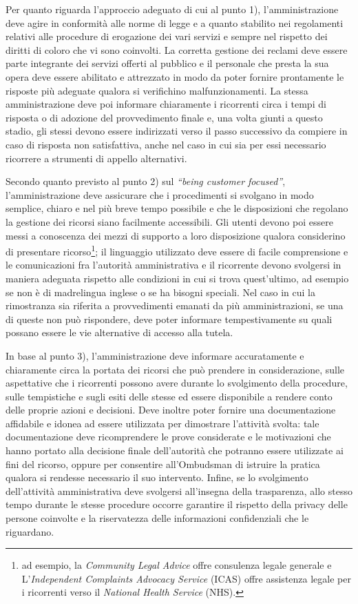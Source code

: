 \documentclass[12pt,it,a4paper,]{report}
\begin{document}
Per quanto riguarda l'approccio adeguato di cui al punto 1),
l'amministrazione deve agire in conformità alle norme di legge e a
quanto stabilito nei regolamenti relativi alle procedure di erogazione
dei vari servizi e sempre nel rispetto dei diritti di coloro che vi sono
coinvolti. La corretta gestione dei reclami deve essere parte integrante
dei servizi offerti al pubblico e il personale che presta la sua opera
deve essere abilitato e attrezzato in modo da poter fornire prontamente
le risposte più adeguate qualora si verifichino malfunzionamenti. La
stessa amministrazione deve poi informare chiaramente i ricorrenti circa
i tempi di risposta o di adozione del provvedimento finale e, una volta
giunti a questo stadio, gli stessi devono essere indirizzati verso il
passo successivo da compiere in caso di risposta non satisfattiva, anche
nel caso in cui sia per essi necessario ricorrere a strumenti di appello
alternativi.

Secondo quanto previsto al punto 2) sul \emph{``being customer
focused''}, l'amministrazione deve assicurare che i procedimenti si
svolgano in modo semplice, chiaro e nel più breve tempo possibile e che
le disposizioni che regolano la gestione dei ricorsi siano facilmente
accessibili. Gli utenti devono poi essere messi a conoscenza dei mezzi
di supporto a loro disposizione qualora considerino di presentare
ricorso\footnote{ad esempio, la \emph{Community Legal Advice} offre
  consulenza legale generale e L'\emph{Independent Complaints Advocacy
  Service} (ICAS) offre assistenza legale per i ricorrenti verso il
  \emph{National Health Service} (NHS).}; il linguaggio utilizzato deve
essere di facile comprensione e le comunicazioni fra l'autorità
amministrativa e il ricorrente devono svolgersi in maniera adeguata
rispetto alle condizioni in cui si trova quest'ultimo, ad esempio se non
è di madrelingua inglese o se ha bisogni speciali. Nel caso in cui la
rimostranza sia riferita a provvedimenti emanati da più amministrazioni,
se una di queste non può rispondere, deve poter informare
tempestivamente su quali possano essere le vie alternative di accesso
alla tutela.

In base al punto 3), l'amministrazione deve informare accuratamente e
chiaramente circa la portata dei ricorsi che può prendere in
considerazione, sulle aspettative che i ricorrenti possono avere durante
lo svolgimento della procedure, sulle tempistiche e sugli esiti delle
stesse ed essere disponibile a rendere conto delle proprie azioni e
decisioni. Deve inoltre poter fornire una documentazione affidabile e
idonea ad essere utilizzata per dimostrare l'attività svolta: tale
documentazione deve ricomprendere le prove considerate e le motivazioni
che hanno portato alla decisione finale dell'autorità che potranno
essere utilizzate ai fini del ricorso, oppure per consentire
all'Ombudsman di istruire la pratica qualora si rendesse necessario il
suo intervento. Infine, se lo svolgimento dell'attività amministrativa
deve svolgersi all'insegna della trasparenza, allo stesso tempo durante
le stesse procedure occorre garantire il rispetto della privacy delle
persone coinvolte e la riservatezza delle informazioni confidenziali che
le riguardano.
\end{document}
